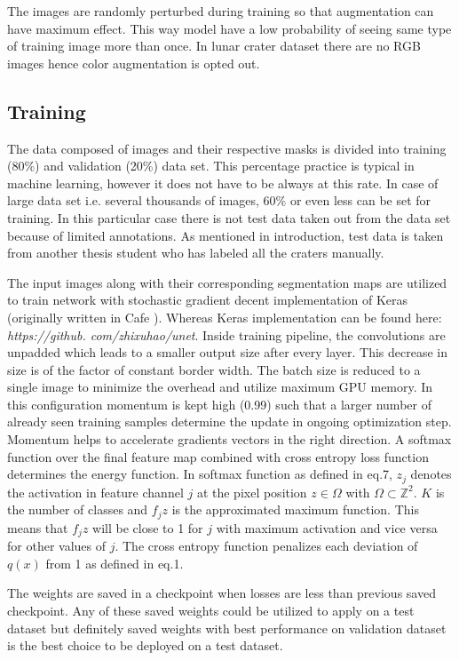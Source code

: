 \documentclass[11pt]{article}
\begin{document}
The images are randomly perturbed during training so that augmentation can have maximum effect. This way model have a low probability of seeing same type of training image more than once. In lunar crater dataset there are no RGB images hence color augmentation is opted out.


\subsection{Training}
The data composed of images and their respective masks is divided into training (80\%) and validation (20\%) data set. This percentage practice is typical in machine learning, however it does not have to be always at this rate. In case of large data set i.e. several thousands of images, 60\% or even less can be set for training. In this particular case there is not test data taken out from the data set because of limited annotations. As mentioned in introduction, test data is taken from another thesis student who has labeled all the craters manually. 

The input images along with their corresponding segmentation maps are utilized to train network with stochastic gradient decent implementation of Keras (originally written in Cafe \cite{ronneberger2015u}). Whereas Keras implementation can be found here:
\textit{https://github.
com/zhixuhao/unet}. Inside training pipeline, the convolutions are unpadded which leads to a smaller output size after every layer. This decrease in size is of the factor of constant border width. The batch size is reduced to a single image to minimize the overhead and utilize maximum GPU memory. In this configuration momentum is kept high (0.99) such that a larger number of already seen training samples determine the update in ongoing optimization step. Momentum helps to accelerate gradients vectors in the right direction. A softmax function over the final feature map combined with cross entropy loss function determines the energy function. In softmax function as defined in eq.7, $z_{j}$ denotes the activation in feature channel $j$ at the pixel position $z \in \Omega$ with $\Omega \subset \mathbb{Z}^{2}$. $K$ is the number of classes and $f_jz$ is the approximated maximum function. This means that $f_jz$ will be close to 1 for $j$ with maximum activation and vice versa for other values of $j$. The cross entropy function penalizes each deviation of $q(x)$ from 1 as defined in eq.1.

The weights are saved in a checkpoint when losses are less than previous saved checkpoint. Any of these saved weights could be utilized to apply on a test dataset but definitely saved weights with best performance on validation dataset is the best choice to be deployed on a test dataset.
\end{document}

